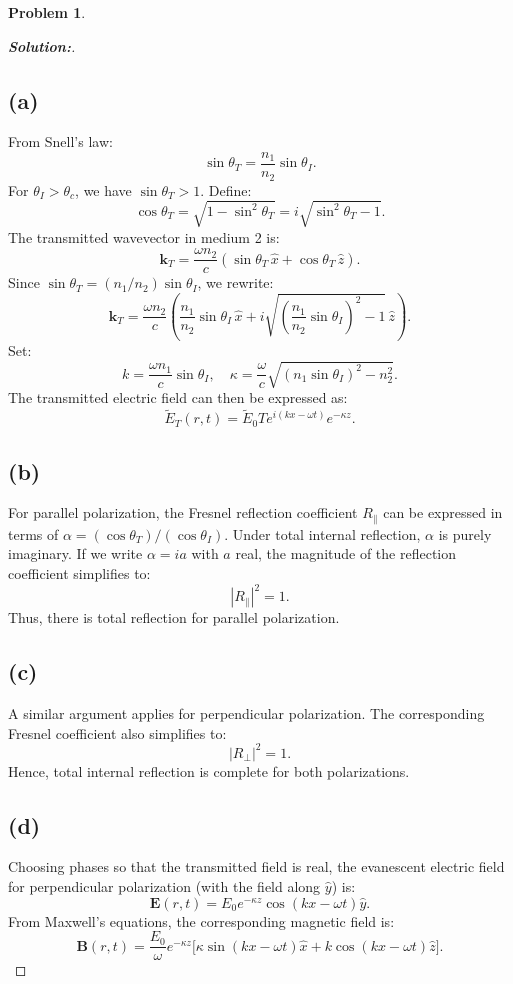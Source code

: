 \documentclass[12pt]{article}
\theoremstyle{definition}\newtheorem{problem}{Problem}
\newenvironment{solution}{\begin{proof}[\bfseries\textup{Solution:}]}{\end{proof}}
\begin{document}
\newpage
\begin{problem}
\end{problem}
\begin{solution}

    \subsection*{(a)}
    From Snell’s law:
    \[
    \sin\theta_T = \frac{n_1}{n_2}\sin\theta_I.
    \]
    For \(\theta_I > \theta_c\), we have \(\sin\theta_T > 1\). Define:
    \[
    \cos\theta_T = \sqrt{1 - \sin^2\theta_T} = i\sqrt{\sin^2\theta_T - 1}.
    \]
    The transmitted wavevector in medium 2 is:
    \[
    \mathbf{k}_T = \frac{\omega n_2}{c}(\sin\theta_T\,\hat{x} + \cos\theta_T\,\hat{z}).
    \]
    Since \(\sin\theta_T = (n_1/n_2)\sin\theta_I\), we rewrite:
    \[
    \mathbf{k}_T = \frac{\omega n_2}{c}\left(\frac{n_1}{n_2}\sin\theta_I\,\hat{x} + i\sqrt{\left(\frac{n_1}{n_2}\sin\theta_I\right)^2 - 1}\,\hat{z}\right).
    \]
    Set:
    \[
    k = \frac{\omega n_1}{c}\sin\theta_I,\quad \kappa = \frac{\omega}{c}\sqrt{(n_1\sin\theta_I)^2 - n_2^2}.
    \]
    The transmitted electric field can then be expressed as:
    \[
    \tilde{E}_T(r,t) = \tilde{E}_0 T e^{i(kx-\omega t)}e^{-\kappa z}.
    \]
    
    \subsection*{(b) }
    For parallel polarization, the Fresnel reflection coefficient \(R_{\parallel}\) can be expressed in terms of \(\alpha = (\cos\theta_T)/(\cos\theta_I)\). Under total internal reflection, \(\alpha\) is purely imaginary. If we write \(\alpha = i a\) with \(a\) real, the magnitude of the reflection coefficient simplifies to:
    \[
    |R_{\parallel}|^2 = 1.
    \]
    Thus, there is total reflection for parallel polarization.
    
    \subsection*{(c) }
    A similar argument applies for perpendicular polarization. The corresponding Fresnel coefficient also simplifies to:
    \[
    |R_{\perp}|^2 = 1.
    \]
    Hence, total internal reflection is complete for both polarizations.
    
    \subsection*{(d)}
    Choosing phases so that the transmitted field is real, the evanescent electric field for perpendicular polarization (with the field along \(\hat{y}\)) is:
    \[
    \mathbf{E}(r,t) = E_0 e^{-\kappa z}\cos(kx-\omega t)\hat{y}.
    \]
    From Maxwell’s equations, the corresponding magnetic field is:
    \[
    \mathbf{B}(r,t) = \frac{E_0}{\omega}e^{-\kappa z}\bigl[\kappa\sin(kx-\omega t)\hat{x} + k\cos(kx-\omega t)\hat{z}\bigr].
    \]
    

\end{solution}
\end{document}

